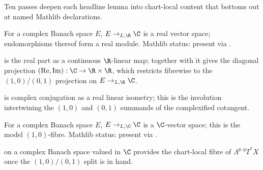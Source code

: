 Ten passes deepen each headline lemma into chart-local content
that bottoms out at named Mathlib declarations.

\begin{lemma}
\label{lem:r7subA-cot-r1}
For a complex Banach space \(E\), \(E\to_{L,\R}\C\) is a real
vector space; endomorphisms thereof form a real module.  Mathlib
status: present via .
\leanok\mathlibok
\end{lemma}

\begin{lemma}
\label{lem:r7subA-cot-r2}
 is the real part as a continuous
\(\R\)-linear map; together with  it gives the
diagonal projection \((\operatorname{Re},\operatorname{Im}):\C\to\R\times\R\), which restricts
fibrewise to the \((1,0)/(0,1)\) projection on
\(E\to_{L,\R}\C\).
\leanok\mathlibok
\end{lemma}

\begin{lemma}
\label{lem:r7subA-cot-r3}
 is complex conjugation as a real linear
isometry; this is the involution intertwining the \((1,0)\) and
\((0,1)\) summands of the complexified cotangent.
\leanok\mathlibok
\end{lemma}

\begin{lemma}
\label{lem:r7subA-exp-r1}
For a complex Banach space \(E\), \(E\to_{L,\C}\C\) is a
\(\C\)-vector space; this is the model \((1,0)\)-fibre.  Mathlib
status: present via .
\leanok\mathlibok
\end{lemma}

\begin{lemma}
\label{lem:r7subA-exp-r2}
 on a complex Banach space valued
in \(\C\) provides the chart-local fibre of \(\Lambda^{p,q}T^{*}X\)
once the \((1,0)/(0,1)\) split is in hand.
\leanok\mathlibok
\end{lemma}

